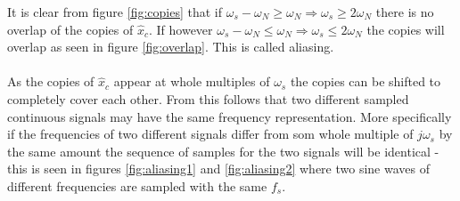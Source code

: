 It is clear from figure \ref{fig:copies} that if $\omega_s-\omega_N\geq \omega_N\Rightarrow \omega_s\geq 2\omega_N$ there is no overlap of the copies of $\hat{x}_c$. If however $\omega_s-\omega_N\leq \omega_N\Rightarrow \omega_s\leq 2\omega_N$ the copies will overlap as seen in figure \ref{fig:overlap}. This is called aliasing.\\\\
As the copies of $\hat{x}_c$ appear at whole multiples of $\omega_s$ the copies can be shifted to completely cover each other. From this follows that two different sampled continuous signals may have the same frequency representation. More specifically if the frequencies of two different signals differ from som whole multiple of $j\omega_s$ by the same amount the sequence of samples for the two signals will be identical - this is seen in figures  \ref{fig:aliasing1} and \ref{fig:aliasing2} where two sine waves of different frequencies are sampled with the same $f_s$.
